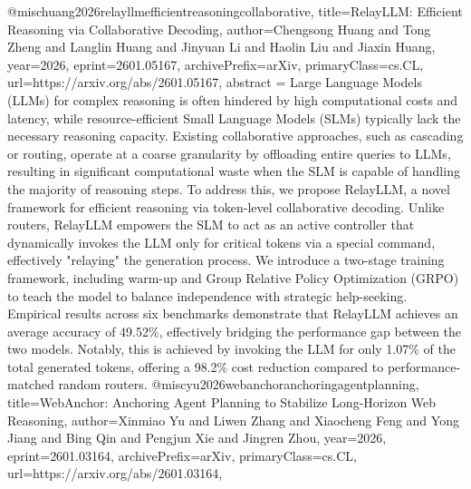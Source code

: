 {}@misc{huang2026relayllmefficientreasoningcollaborative,
      title={RelayLLM: Efficient Reasoning via Collaborative Decoding}, 
      author={Chengsong Huang and Tong Zheng and Langlin Huang and Jinyuan Li and Haolin Liu and Jiaxin Huang},
      year={2026},
      eprint={2601.05167},
      archivePrefix={arXiv},
      primaryClass={cs.CL},
      url={https://arxiv.org/abs/2601.05167},
      abstract = {Large Language Models (LLMs) for complex reasoning is often hindered by high computational costs and latency, while resource-efficient Small Language Models (SLMs) typically lack the necessary reasoning capacity. Existing collaborative approaches, such as cascading or routing, operate at a coarse granularity by offloading entire queries to LLMs, resulting in significant computational waste when the SLM is capable of handling the majority of reasoning steps. To address this, we propose RelayLLM, a novel framework for efficient reasoning via token-level collaborative decoding. Unlike routers, RelayLLM empowers the SLM to act as an active controller that dynamically invokes the LLM only for critical tokens via a special command, effectively "relaying" the generation process. We introduce a two-stage training framework, including warm-up and Group Relative Policy Optimization (GRPO) to teach the model to balance independence with strategic help-seeking. Empirical results across six benchmarks demonstrate that RelayLLM achieves an average accuracy of 49.52\%, effectively bridging the performance gap between the two models. Notably, this is achieved by invoking the LLM for only 1.07\% of the total generated tokens, offering a 98.2\% cost reduction compared to performance-matched random routers.}
}@misc{yu2026webanchoranchoringagentplanning,
      title={WebAnchor: Anchoring Agent Planning to Stabilize Long-Horizon Web Reasoning}, 
      author={Xinmiao Yu and Liwen Zhang and Xiaocheng Feng and Yong Jiang and Bing Qin and Pengjun Xie and Jingren Zhou},
      year={2026},
      eprint={2601.03164},
      archivePrefix={arXiv},
      primaryClass={cs.CL},
      url={https://arxiv.org/abs/2601.03164},
}
